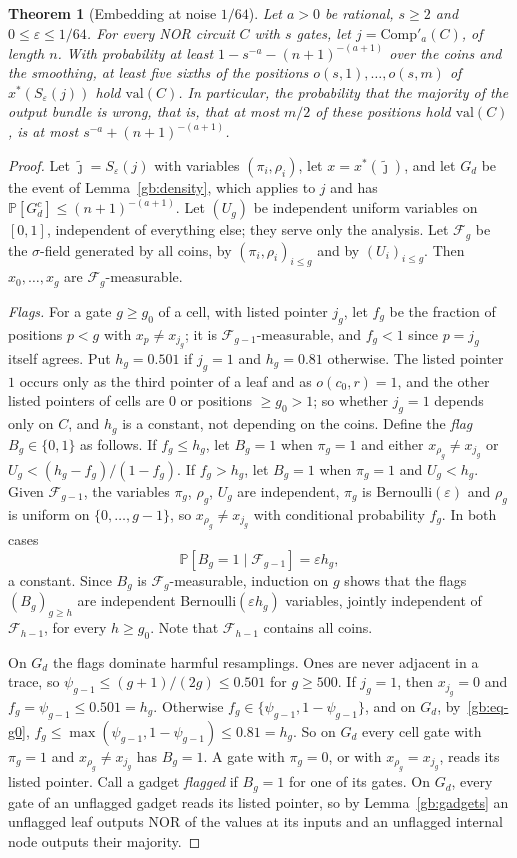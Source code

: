 \documentclass[11pt]{amsart}
\newtheorem{theorem}{Theorem}
\theoremstyle{definition}
\theoremstyle{remark}
\newcommand{\eps}{\varepsilon}
\newcommand{\jt}{\tilde{\jmath}}
\newcommand{\NOR}{\mathrm{NOR}}
\newcommand{\val}{\mathrm{val}}
\newcommand{\PP}{\mathbb{P}}
\newcommand{\cF}{\mathcal{F}}
\newcommand{\Comp}{\mathrm{Comp}}
\begin{document}
\begin{theorem}[Embedding at noise $1/64$]\label{gb:embed}
Let $a>0$ be rational, $s\ge2$ and $0\le\eps\le1/64$. For every NOR circuit
$C$ with $s$ gates, let $j=\Comp'_a(C)$, of length $n$. With probability at
least $1-s^{-a}-(n+1)^{-(a+1)}$ over the coins and the smoothing, at least
five sixths of the positions $o(s,1),\dots,o(s,m)$ of $x^*(S_\eps(j))$ hold
$\val(C)$. In particular, the probability that the majority of the output
bundle is wrong, that is, that at most $m/2$ of these positions hold
$\val(C)$, is at most $s^{-a}+(n+1)^{-(a+1)}$.
\end{theorem}

\begin{proof}
Let $\jt=S_\eps(j)$ with variables $(\pi_i,\rho_i)$, let $x=x^*(\jt)$, and
let $G_d$ be the event of Lemma~\ref{gb:density}, which applies to $j$ and
has $\PP[G_d^c]\le(n+1)^{-(a+1)}$. Let $(U_g)$ be independent uniform
variables on $[0,1]$, independent of everything else; they serve only the
analysis. Let $\cF_g$ be the $\sigma$-field generated by all coins, by
$(\pi_i,\rho_i)_{i\le g}$ and by $(U_i)_{i\le g}$. Then
$x_0,\dots,x_g$ are $\cF_g$-measurable.

\emph{Flags.} For a gate $g\ge g_0$ of a cell, with listed pointer $j_g$,
let $f_g$ be the fraction of positions $p<g$ with $x_p\ne x_{j_g}$; it is
$\cF_{g-1}$-measurable, and $f_g<1$ since $p=j_g$ itself agrees. Put
$h_g=0.501$ if $j_g=1$ and $h_g=0.81$ otherwise. The listed pointer $1$
occurs only as the third pointer of a leaf and as $o(c_0,r)=1$, and the
other listed pointers of cells are $0$ or positions $\ge g_0>1$; so whether
$j_g=1$ depends only on $C$, and $h_g$ is a constant, not depending on the
coins. Define the \emph{flag} $B_g\in\{0,1\}$ as follows. If $f_g\le h_g$,
let $B_g=1$ when $\pi_g=1$ and either $x_{\rho_g}\ne x_{j_g}$ or
$U_g<(h_g-f_g)/(1-f_g)$. If $f_g>h_g$, let $B_g=1$ when $\pi_g=1$ and
$U_g<h_g$. Given $\cF_{g-1}$, the variables $\pi_g$, $\rho_g$, $U_g$ are
independent, $\pi_g$ is Bernoulli$(\eps)$ and $\rho_g$ is uniform on
$\{0,\dots,g-1\}$, so $x_{\rho_g}\ne x_{j_g}$ with conditional probability
$f_g$. In both cases
\[
\PP[B_g=1\mid\cF_{g-1}]=\eps h_g,
\]
a constant. Since $B_g$ is $\cF_g$-measurable, induction on $g$ shows that
the flags $(B_g)_{g\ge h}$ are independent Bernoulli$(\eps h_g)$ variables,
jointly independent of $\cF_{h-1}$, for every $h\ge g_0$. Note that
$\cF_{h-1}$ contains all coins.

On $G_d$ the flags dominate harmful resamplings. Ones are never adjacent in
a trace, so $\psi_{g-1}\le(g+1)/(2g)\le0.501$ for $g\ge500$. If $j_g=1$,
then $x_{j_g}=0$ and $f_g=\psi_{g-1}\le0.501=h_g$. Otherwise
$f_g\in\{\psi_{g-1},1-\psi_{g-1}\}$, and on $G_d$, by~\eqref{gb:eq-g0},
$f_g\le\max(\psi_{g-1},1-\psi_{g-1})\le0.81=h_g$. So on $G_d$ every cell gate
with $\pi_g=1$ and $x_{\rho_g}\ne x_{j_g}$ has $B_g=1$. A gate with
$\pi_g=0$, or with $x_{\rho_g}=x_{j_g}$, reads its listed pointer. Call a
gadget \emph{flagged} if $B_g=1$ for one of its gates. On $G_d$, every gate
of an unflagged gadget reads its listed pointer, so by
Lemma~\ref{gb:gadgets} an unflagged leaf outputs $\NOR$ of the values at
its inputs and an unflagged internal node outputs their majority.


\end{proof}
\end{document}

